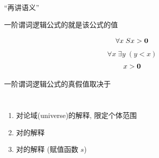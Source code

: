 
\begin{frame}{}
  \begin{center}
    {\Large ``再讲语义''}

    \vspace{0.30cm}
  \end{center}
\end{frame}

\begin{frame}{}
  \begin{center}
    一阶谓词逻辑公式的就是该公式的值

    \pause
    \[
      \forall x\; Sx > {\bf 0}
    \]
    \[
      \forall x\; \exists y\; (y < x)
    \]
    \[
      x > {\bf 0}
    \]

    \pause
    \vspace{0.60cm}
    一阶谓词逻辑公式的真假值取决于
    \begin{columns}
        \begin{enumerate}[(1)]
          \setlength{\itemsep}{6pt}
          \item 对论域(universe)的解释, 限定个体范围
          \item 对的解释
          \item 对的解释 (赋值函数 $s$)
        \end{enumerate}
    \end{columns}

    \pause
    \vspace{0.60cm}
  \end{center}
\end{frame}

